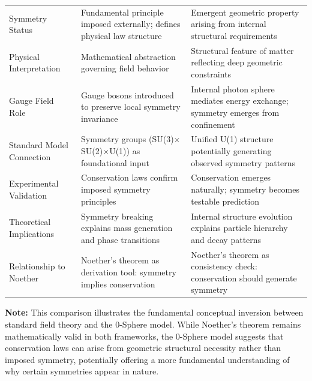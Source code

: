 \documentclass[%
 reprint,
 amsmath,amssymb,
 aps,
]{revtex4-1}
\numberwithin{equation}{section}%
\begin{document}
\begin{table}[t!]
\begin{tabular}{p{4.8cm}p{6.2cm}p{6.2cm}}
\addlinespace[0.3cm]
Symmetry Status & Fundamental principle imposed externally; defines physical law structure & Emergent geometric property arising from internal structural requirements \\
\addlinespace[0.3cm]
Physical Interpretation & Mathematical abstraction governing field behavior & Structural feature of matter reflecting deep geometric constraints \\
\addlinespace[0.3cm]
Gauge Field Role & Gauge bosons introduced to preserve local symmetry invariance & Internal photon sphere mediates energy exchange; symmetry emerges from confinement \\
\addlinespace[0.3cm]
Standard Model Connection & Symmetry groups (SU(3)$\times$SU(2)$\times$U(1)) as foundational input & Unified U(1) structure potentially generating observed symmetry patterns \\
\addlinespace[0.3cm]
Experimental Validation & Conservation laws confirm imposed symmetry principles & Conservation emerges naturally; symmetry becomes testable prediction \\
\addlinespace[0.3cm]
Theoretical Implications & Symmetry breaking explains mass generation and phase transitions & Internal structure evolution explains particle hierarchy and decay patterns \\
\addlinespace[0.3cm]
Relationship to Noether & Noether's theorem as derivation tool: symmetry implies conservation & Noether's theorem as consistency check: conservation should generate symmetry \\
\bottomrule
\end{tabular}
\vspace{0.2cm}
\begin{flushleft}
\footnotesize
\textbf{Note:} This comparison illustrates the fundamental conceptual inversion between standard field theory and the 0-Sphere model. While Noether's theorem remains mathematically valid in both frameworks, the 0-Sphere model suggests that conservation laws can arise from geometric structural necessity rather than imposed symmetry, potentially offering a more fundamental understanding of why certain symmetries appear in nature.
\end{flushleft}
\end{table}

\end{document}
